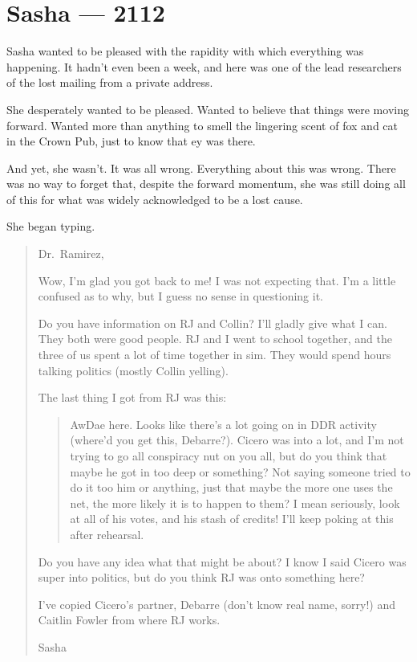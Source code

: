 \hypertarget{sasha-2112}{%
\chapter*{Sasha — 2112}\label{sasha-2112}}

Sasha wanted to be pleased with the rapidity with which everything was happening. It hadn't even been a week, and here was one of the lead researchers of the lost mailing from a private address.

She desperately wanted to be pleased. Wanted to believe that things were moving forward. Wanted more than anything to smell the lingering scent of fox and cat in the Crown Pub, just to know that ey was there.

And yet, she wasn't. It was all wrong. Everything about this was wrong. There was no way to forget that, despite the forward momentum, she was still doing all of this for what was widely acknowledged to be a lost cause.

She began typing.

\begin{quote}
Dr.~Ramirez,

Wow, I'm glad you got back to me! I was not expecting that. I'm a little confused as to why, but I guess no sense in questioning it.

Do you have information on RJ and Collin? I'll gladly give what I can. They both were good people. RJ and I went to school together, and the three of us spent a lot of time together in sim. They would spend hours talking politics (mostly Collin yelling).

The last thing I got from RJ was this:

\begin{quote}
AwDae here. Looks like there's a lot going on in DDR activity (where'd you get this, Debarre?). Cicero was into a lot, and I'm not trying to go all conspiracy nut on you all, but do you think that maybe he got in too deep or something? Not saying someone tried to do it too him or anything, just that maybe the more one uses the net, the more likely it is to happen to them? I mean seriously, look at all of his votes, and his stash of credits! I'll keep poking at this after rehearsal.
\end{quote}

Do you have any idea what that might be about? I know I said Cicero was super into politics, but do you think RJ was onto something here?

I've copied Cicero's partner, Debarre (don't know real name, sorry!) and Caitlin Fowler from where RJ works.

Sasha
\end{quote}

